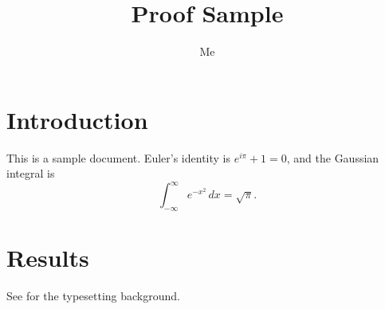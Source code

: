 \documentclass{article}
\title{Proof Sample}
\author{Me}
\begin{document}
\maketitle

\section{Introduction}
This is a sample document. Euler's identity is $e^{i\pi} + 1 = 0$, and
the Gaussian integral is
\begin{equation}
  \int_{-\infty}^{\infty} e^{-x^2}\,dx = \sqrt{\pi}.
\end{equation}

\section{Results}
See \cite{knuth} for the typesetting background.





\end{document}
